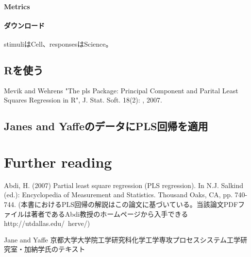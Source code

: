 \paragraph{Metrics}
\paragraph{ダウンロード}
stimuliはCell、responsesはScience。

\subsection{Rを使う}
Mevik and Wehrens "The pls Package: Principal Component and Parital Least Squares Regression in R", J. Stat. Soft. 18(2): , 2007.

\subsection{Janes and YaffeのデータにPLS回帰を適用}
\section{Further reading}
Abdi, H. (2007) Partial least square regression (PLS regression). In N.J. Salkind (ed.): Encyclopedia of Measurement and Statistics. Thousand Oaks, CA, pp. 740-744.
(本書におけるPLS回帰の解説はこの論文に基づいている。当該論文PDFファイルは著者であるAbdi教授のホームページから入手できる http://utdallas.edu/~herve/)

Jane and Yaffe
京都大学大学院工学研究科化学工学専攻プロセスシステム工学研究室・加納学氏のテキスト
